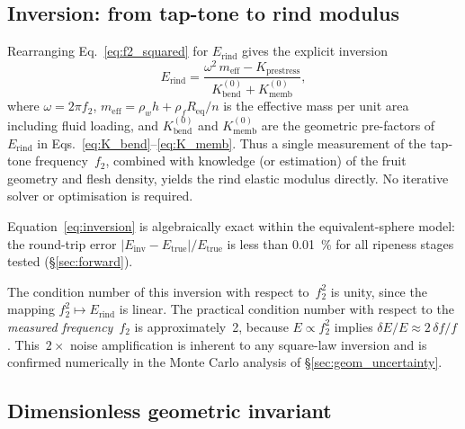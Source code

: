 \subsection{Inversion: from tap-tone to rind modulus}
\label{sec:inversion}

Rearranging Eq.~\eqref{eq:f2_squared} for $E_{\mathrm{rind}}$ gives
the explicit inversion
\begin{equation}
  \boxed{
    E_{\mathrm{rind}} = \frac{\omega^2\, m_{\mathrm{eff}}
      - K_{\mathrm{prestress}}}
      {K_{\mathrm{bend}}^{(0)} + K_{\mathrm{memb}}^{(0)}},
  }
  \label{eq:inversion}
\end{equation}
where $\omega = 2\pi f_2$, $m_{\mathrm{eff}} = \rho_w h + \rho_f
R_{\mathrm{eq}} / n$ is the effective mass per unit area including
fluid loading, and $K_{\mathrm{bend}}^{(0)}$ and
$K_{\mathrm{memb}}^{(0)}$ are the geometric pre-factors of
$E_{\mathrm{rind}}$ in Eqs.~\eqref{eq:K_bend}--\eqref{eq:K_memb}.
Thus a single measurement of the tap-tone frequency~$f_2$, combined
with knowledge (or estimation) of the fruit geometry and flesh density,
yields the rind elastic modulus directly.  No iterative solver or
optimisation is required.

Equation~\eqref{eq:inversion} is algebraically exact within the
equivalent-sphere model: the
round-trip error $|E_{\mathrm{inv}} - E_{\mathrm{true}}| /
E_{\mathrm{true}}$ is less than \SI{0.01}{\percent} for all ripeness
stages tested (\S\ref{sec:forward}).

The condition number of this inversion with respect to~$f_2^2$ is unity,
since the mapping $f_2^2 \mapsto E_{\mathrm{rind}}$ is linear.  The
practical condition number with respect to the \emph{measured
frequency}~$f_2$ is approximately~2, because $E \propto f_2^2$ implies
$\delta E / E \approx 2\, \delta f / f$.  This~$2\times$ noise
amplification is inherent to any square-law inversion and is confirmed
numerically in the Monte Carlo analysis of \S\ref{sec:geom_uncertainty}.

\subsection{Dimensionless geometric invariant}
\label{sec:Pi_ripe}

